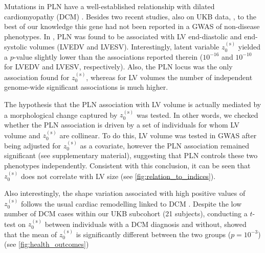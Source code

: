 Mutations in PLN have a well-established relationship with dilated cardiomyopathy (DCM) \cite{ref_Eijgenraam}. Besides two recent studies, also on UKB data, \cite{ref_pirruccello}, to the best of our knowledge this gene had not been reported in a GWAS of non-disease phenotypes. In \cite{ref_pirruccello}, PLN was found to be associated with LV end-diastolic and end-systolic volumes (LVEDV and LVESV). Interestingly, latent variable $z_0^{(\text{s})}$ yielded a $p$-value slightly lower than the associations reported therein ($10^{-16}$ and $10^{-10}$ for LVEDV and LVESV, respectively). Also, the PLN locus was the only association found for $z_0^{(\text{s})}$, whereas for LV volumes the number of independent genome-wide significant associations is much higher. 

The hypothesis that the PLN association with LV volume is actually mediated by a morphological change captured by $z_0^{(\text{s})}$ was tested. In other words, we checked whether the PLN association is driven by a set of individuals for whom LV volume and $z_0^{(\text{s})}$ are collinear. To do this, LV volume was tested in GWAS after being adjusted for $z_0^{(\text{s})}$ as a covariate, however the PLN association remained significant (see supplementary material), suggesting that PLN controls these two phenotypes independently. Consistent with this conclusion, it can be seen that $z_0^{(\text{s})}$ does not correlate with LV size (see \ref{fig:relation_to_indices}).

Also interestingly, the shape variation associated with high positive values of $z_0^{(\text{s})}$ follows the usual cardiac remodelling linked to DCM \cite{ref_dcm}. Despite the low number of DCM cases within our UKB subcohort (21 subjects), conducting a $t$-test on $z_0^{(\text{s})}$ between individuals with a DCM diagnosis and without, showed that the mean of $z_0^{(\text{s})}$ is significantly different between the two groups ($p=10^{-3}$) (see \ref{fig:health_outcomes})

